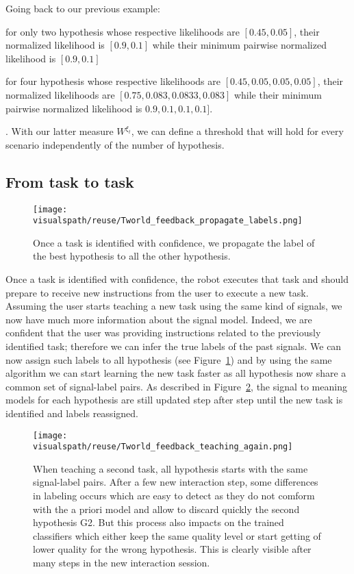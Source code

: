 Going back to our previous example: \begin{inparaenum}[a)] \item for only two hypothesis whose respective likelihoods are $[0.45, 0.05]$, their normalized likelihood is $[0.9,0.1]$ while their minimum pairwise normalized likelihood is $[0.9, 0.1]$ \item for four hypothesis whose respective likelihoods are $[0.45, 0.05, 0.05, 0.05]$, their normalized likelihoods are $[0.75, 0.083, 0.0833, 0.083]$ while their minimum pairwise normalized likelihood is $0.9, 0.1, 0.1, 0.1]$. \end{inparaenum}. With our latter measure $W^{\xi_t}$, we can define a threshold that will hold for every scenario independently of the number of hypothesis. 

\subsection{From task to task}
\label{chapter:lfui:tasttotask}

\begin{figure}[!ht]
  \centering
  \texttt{[image: \\visualspath/reuse/Tworld\_feedback\_propagate\_labels.png]}
  \caption{Once a task is identified with confidence, we propagate the label of the best hypothesis to all the other hypothesis.}
  \label{fig:TworldPropagate}
\end{figure}

Once a task is identified with confidence, the robot executes that task and should prepare to receive new instructions from the user to execute a new task. Assuming the user starts teaching a new task using the same kind of signals, we now have much more information about the signal model. Indeed, we are confident that the user was providing instructions related to the previously identified task; therefore we can infer the true labels of the past signals. We can now  assign such labels to all hypothesis (see Figure~\ref{fig:TworldPropagate}) and by using the same algorithm we can start learning the new task faster as all hypothesis now share a common set of signal-label pairs. As described in Figure~\ref{fig:TworldReuse}, the signal to meaning models for each hypothesis are still updated step after step until the new task is identified and labels reassigned.


\begin{figure}[!ht]
  \centering
  \texttt{[image: \\visualspath/reuse/Tworld\_feedback\_teaching\_again.png]}
  \caption{When teaching a second task, all hypothesis starts with the same signal-label pairs. After a few new interaction step, some differences in labeling occurs which are easy to detect as they do not comform with the a priori model and allow to discard quickly the second hypothesis G2. But this process also impacts on the trained classifiers which either keep the same quality level or start getting of lower quality for the wrong hypothesis. This is clearly visible after many steps in the new interaction session.}
  \label{fig:TworldReuse}
\end{figure}

